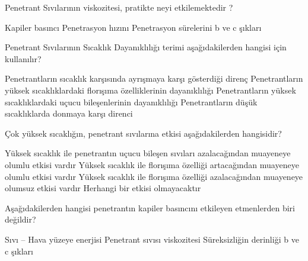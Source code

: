 \begin{question}[subtitle=]
Penetrant Sıvılarının viskozitesi, pratikte neyi etkilemektedir ?
	\begin{tasks}
          \task Kapiler basıncı
          \task Penetrasyon hızını
          \task Penetrasyon sürelerini
          \task b ve c şıkları \correct
	\end{tasks}
\end{question}
\begin{solution}
	\correct
\end{solution}

\begin{question}[subtitle=]
Penetrant Sıvılarının  Sıcaklık Dayanıklılığı terimi aşağıdakilerden hangisi için kullanılır?
	\begin{tasks}
          \task Penetrantların sıcaklık karşısında ayrışmaya karşı gösterdiği direnç \correct
          \task Penetrantların yüksek sıcaklıklardaki florışıma özelliklerinin dayanıklılığı
          \task Penetrantların yüksek sıcaklıklardaki uçucu bileşenlerinin dayanıklılığı
          \task Penetrantların düşük sıcaklıklarda donmaya karşı direnci
	\end{tasks}
\end{question}
\begin{solution}
	\correct
\end{solution}


\begin{question}[subtitle=]
Çok yüksek sıcaklığın, penetrant sıvılarına etkisi aşağıdakilerden hangisidir?
	\begin{tasks}
          \task Yüksek sıcaklık ile penetrantın uçucu bileşen sıvıları azalacağından muayeneye olumlu etkisi vardır
          \task Yüksek sıcaklık ile florışıma özelliği artacağından muayeneye olumlu etkisi vardır
          \task Yüksek sıcaklık ile florışıma özelliği azalacağından muayeneye olumsuz etkisi vardır \correct
          \task Herhangi bir etkisi olmayacaktır
	\end{tasks}
\end{question}
\begin{solution}
	\correct
\end{solution}

\begin{question}[subtitle=]
Aşağıdakilerden hangisi penetrantın kapiler basıncını etkileyen etmenlerden biri değildir?
	\begin{tasks}
          \task Sıvı – Hava yüzeye enerjisi
          \task Penetrant sıvısı viskozitesi
          \task Süreksizliğin derinliği
          \task b ve c şıkları \correct
	\end{tasks}
\end{question}
\begin{solution}
	\correct
\end{solution}

